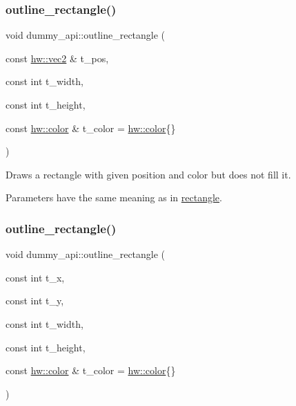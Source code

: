 \subsubsection{\texorpdfstring{outline\+\_\+rectangle()}{outline\_rectangle()}\hspace{0.1cm}{\footnotesize\ttfamily [1/2]}}
{\footnotesize\ttfamily void dummy\+\_\+api\+::outline\+\_\+rectangle (\begin{DoxyParamCaption}\item[{const \mbox{\hyperlink{structhw_1_1vec2}{hw\+::vec2}} \&}]{t\+\_\+pos,  }\item[{const int}]{t\+\_\+width,  }\item[{const int}]{t\+\_\+height,  }\item[{const \mbox{\hyperlink{structhw_1_1color}{hw\+::color}} \&}]{t\+\_\+color = {\ttfamily \mbox{\hyperlink{structhw_1_1color}{hw\+::color}}\{\}} }\end{DoxyParamCaption})}



Draws a rectangle with given position and color but does not fill it. 

Parameters have the same meaning as in \mbox{\hyperlink{namespacedummy__api_acb6344e33577af291978e41b3322c14b}{rectangle}}. \mbox{\label{namespacedummy__api_a07cc87a9879b2f59afb9c2d41904c024}} 
\subsubsection{\texorpdfstring{outline\+\_\+rectangle()}{outline\_rectangle()}\hspace{0.1cm}{\footnotesize\ttfamily [2/2]}}
{\footnotesize\ttfamily void dummy\+\_\+api\+::outline\+\_\+rectangle (\begin{DoxyParamCaption}\item[{const int}]{t\+\_\+x,  }\item[{const int}]{t\+\_\+y,  }\item[{const int}]{t\+\_\+width,  }\item[{const int}]{t\+\_\+height,  }\item[{const \mbox{\hyperlink{structhw_1_1color}{hw\+::color}} \&}]{t\+\_\+color = {\ttfamily \mbox{\hyperlink{structhw_1_1color}{hw\+::color}}\{\}} }\end{DoxyParamCaption})}

